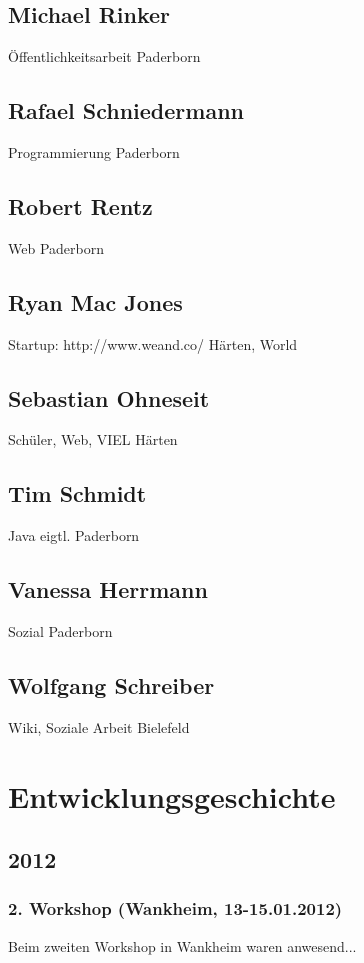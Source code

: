 \begin{appendix}
\section{Michael Rinker}
Öffentlichkeitsarbeit
Paderborn

\section{Rafael Schniedermann}
Programmierung
Paderborn

\section{Robert Rentz}
Web
Paderborn

\section{Ryan Mac Jones}
Startup: http://www.weand.co/
Härten, World

\section{Sebastian Ohneseit}
Schüler, Web, VIEL
Härten

\section{Tim Schmidt}
Java
eigtl. Paderborn

\section{Vanessa Herrmann}
Sozial
Paderborn

\section{Wolfgang Schreiber}
Wiki, Soziale Arbeit
Bielefeld


\chapter{Entwicklungsgeschichte}
  \section{2012}
    \subsection{2. Workshop (Wankheim, 13-15.01.2012)}
Beim zweiten Workshop in Wankheim waren anwesend...

\end{appendix}
